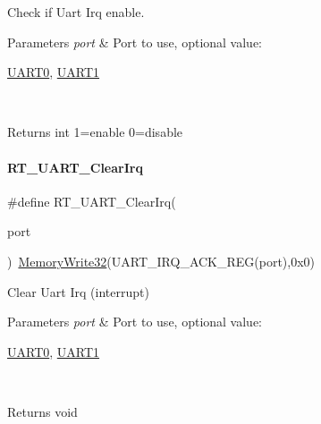 Check if Uart Irq enable. 


\begin{DoxyParams}{Parameters}
{\em port} & Port to use, optional value\+:
\begin{DoxyCode}
\mbox{\hyperlink{a00098_a0508661f121639ffdee7de2353a0def2}{UART0}}, \mbox{\hyperlink{a00098_a8d69bf04d07af4fbbab5a8bd291f65ff}{UART1}}
\end{DoxyCode}
 \\
\hline
\end{DoxyParams}
\begin{DoxyReturn}{Returns}
int 1=enable 0=disable 
\end{DoxyReturn}
\mbox{\label{a00098_a84e87fc64f3149f1d5171ddca5719220}} 
\paragraph{\texorpdfstring{R\+T\+\_\+\+U\+A\+R\+T\+\_\+\+Clear\+Irq}{RT\_UART\_ClearIrq}}
{\footnotesize\ttfamily \#define R\+T\+\_\+\+U\+A\+R\+T\+\_\+\+Clear\+Irq(\begin{DoxyParamCaption}\item[{}]{port }\end{DoxyParamCaption})~\mbox{\hyperlink{a00026_a6b9732365b12e48ddb89fe1028b975b0}{Memory\+Write32}}(U\+A\+R\+T\+\_\+\+I\+R\+Q\+\_\+\+A\+C\+K\+\_\+\+R\+EG(port),0x0)}



Clear Uart Irq (interrupt) 


\begin{DoxyParams}{Parameters}
{\em port} & Port to use, optional value\+:
\begin{DoxyCode}
\mbox{\hyperlink{a00098_a0508661f121639ffdee7de2353a0def2}{UART0}}, \mbox{\hyperlink{a00098_a8d69bf04d07af4fbbab5a8bd291f65ff}{UART1}}
\end{DoxyCode}
 \\
\hline
\end{DoxyParams}
\begin{DoxyReturn}{Returns}
void 
\end{DoxyReturn}
\mbox{\label{a00098_aab59c28b31f6d93c8400c2af10cc0b05}} 
